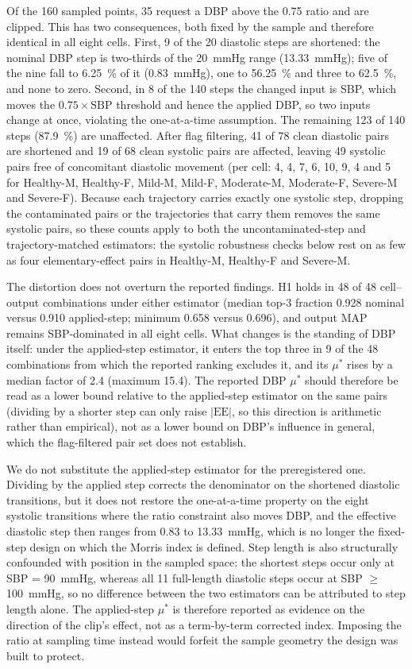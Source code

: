\documentclass[pdflatex,sn-nature]{sn-jnl}%
\begin{document}
Of the 160 sampled points, 35 request a DBP above the 0.75 ratio and are clipped. This has two consequences, both fixed by the sample and therefore identical in all eight cells. First, 9 of the 20 diastolic steps are shortened: the nominal DBP step is two-thirds of the 20~mmHg range (13.33~mmHg); five of the nine fall to 6.25~\% of it (0.83~mmHg), one to 56.25~\% and three to 62.5~\%, and none to zero. Second, in 8 of the 140 steps the changed input is SBP, which moves the $0.75 \times \mathrm{SBP}$ threshold and hence the applied DBP, so two inputs change at once, violating the one-at-a-time assumption. The remaining 123 of 140 steps (87.9~\%) are unaffected. After flag filtering, 41 of 78 clean diastolic pairs are shortened and 19 of 68 clean systolic pairs are affected, leaving 49 systolic pairs free of concomitant diastolic movement (per cell: 4, 4, 7, 6, 10, 9, 4 and 5 for Healthy-M, Healthy-F, Mild-M, Mild-F, Moderate-M, Moderate-F, Severe-M and Severe-F). Because each trajectory carries exactly one systolic step, dropping the contaminated pairs or the trajectories that carry them removes the same systolic pairs, so these counts apply to both the uncontaminated-step and trajectory-matched estimators: the systolic robustness checks below rest on as few as four elementary-effect pairs in Healthy-M, Healthy-F and Severe-M.

The distortion does not overturn the reported findings. H1 holds in 48 of 48 cell--output combinations under either estimator (median top-3 fraction 0.928 nominal versus 0.910 applied-step; minimum 0.658 versus 0.696), and output MAP remains SBP-dominated in all eight cells. What changes is the standing of DBP itself: under the applied-step estimator, it enters the top three in 9 of the 48 combinations from which the reported ranking excludes it, and its $\mu^{*}$ rises by a median factor of 2.4 (maximum 15.4). The reported DBP $\mu^{*}$ should therefore be read as a lower bound relative to the applied-step estimator on the same pairs (dividing by a shorter step can only raise $|\mathrm{EE}|$, so this direction is arithmetic rather than empirical), not as a lower bound on DBP's influence in general, which the flag-filtered pair set does not establish.

We do not substitute the applied-step estimator for the preregistered one. Dividing by the applied step corrects the denominator on the shortened diastolic transitions, but it does not restore the one-at-a-time property on the eight systolic transitions where the ratio constraint also moves DBP, and the effective diastolic step then ranges from 0.83 to 13.33~mmHg, which is no longer the fixed-step design on which the Morris index is defined. Step length is also structurally confounded with position in the sampled space: the shortest steps occur only at SBP = 90~mmHg, whereas all 11 full-length diastolic steps occur at SBP $\geq$ 100~mmHg, so no difference between the two estimators can be attributed to step length alone. The applied-step $\mu^{*}$ is therefore reported as evidence on the direction of the clip's effect, not as a term-by-term corrected index. Imposing the ratio at sampling time instead would forfeit the sample geometry the design was built to protect.
\end{document}
